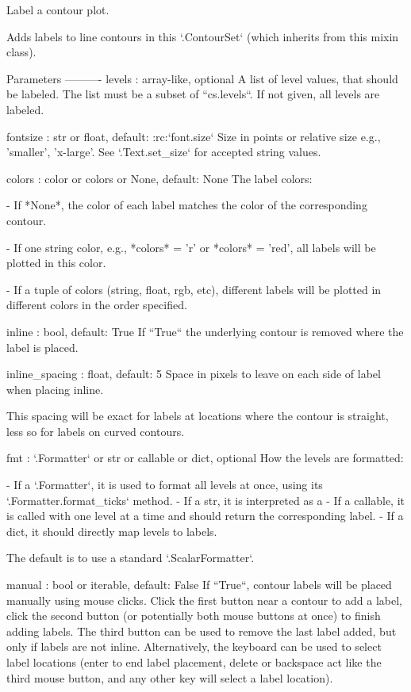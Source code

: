\begin{DoxyVerb}Label a contour plot.

Adds labels to line contours in this `.ContourSet` (which inherits from
this mixin class).

Parameters
----------
levels : array-like, optional
    A list of level values, that should be labeled. The list must be
    a subset of ``cs.levels``. If not given, all levels are labeled.

fontsize : str or float, default: :rc:`font.size`
    Size in points or relative size e.g., 'smaller', 'x-large'.
    See `.Text.set_size` for accepted string values.

colors : color or colors or None, default: None
    The label colors:

    - If *None*, the color of each label matches the color of
      the corresponding contour.

    - If one string color, e.g., *colors* = 'r' or *colors* =
      'red', all labels will be plotted in this color.

    - If a tuple of colors (string, float, rgb, etc), different labels
      will be plotted in different colors in the order specified.

inline : bool, default: True
    If ``True`` the underlying contour is removed where the label is
    placed.

inline_spacing : float, default: 5
    Space in pixels to leave on each side of label when placing inline.

    This spacing will be exact for labels at locations where the
    contour is straight, less so for labels on curved contours.

fmt : `.Formatter` or str or callable or dict, optional
    How the levels are formatted:

    - If a `.Formatter`, it is used to format all levels at once, using
      its `.Formatter.format_ticks` method.
    - If a str, it is interpreted as a %
    - If a callable, it is called with one level at a time and should
      return the corresponding label.
    - If a dict, it should directly map levels to labels.

    The default is to use a standard `.ScalarFormatter`.

manual : bool or iterable, default: False
    If ``True``, contour labels will be placed manually using
    mouse clicks. Click the first button near a contour to
    add a label, click the second button (or potentially both
    mouse buttons at once) to finish adding labels. The third
    button can be used to remove the last label added, but
    only if labels are not inline. Alternatively, the keyboard
    can be used to select label locations (enter to end label
    placement, delete or backspace act like the third mouse button,
    and any other key will select a label location).


\end{DoxyVerb}

